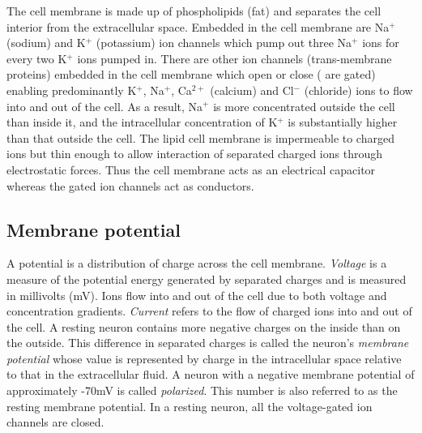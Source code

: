 The cell membrane is made up of phospholipids (fat) and separates the cell interior from the extracellular space. Embedded in the cell membrane are Na$^{+}$ (sodium) and K$^{+}$ (potassium) ion channels which pump out three Na$^{+}$ ions for every two K$^{+}$ ions pumped in. There are other ion channels (trans-membrane proteins) embedded in the cell membrane which
open or close ( are gated)  enabling predominantly K$^{+}$, Na$^{+}$, Ca$^{2+}$ (calcium) and Cl$^{-}$ (chloride) ions to flow into and out of the cell. As a result, Na$^{+}$ is more concentrated outside the cell than inside it, and the intracellular concentration of K$^{+}$ is substantially higher than that outside the cell.
The lipid cell membrane is impermeable to charged ions but thin enough to allow interaction
of separated charged ions through electrostatic forces. 
Thus the cell membrane acts as an electrical capacitor whereas the gated ion channels act as conductors.

\subsection{Membrane potential}
A potential is a distribution of charge across the cell membrane.
\textit{Voltage} is a measure of the potential energy generated by separated charges and is measured in millivolts (mV). Ions flow into and out of the cell due to both voltage and concentration gradients. \textit{Current} refers to the flow of charged ions into and out of the cell. A resting neuron contains more negative charges on the inside than on the outside. 
This difference in separated charges is called the neuron's \textit{membrane potential}
whose value is represented by charge in the intracellular space relative to that in the extracellular fluid. A neuron with a negative membrane potential of approximately -70mV is called \textit{polarized}. This number is also referred to as the resting membrane potential.
In a resting neuron, all the voltage-gated ion channels are closed. 

